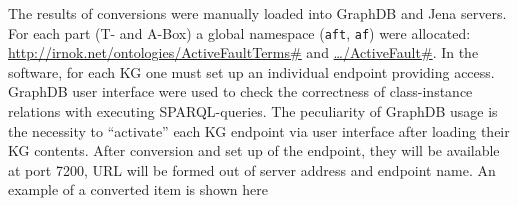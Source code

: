 \documentclass[
]{ceurart}
\begin{document}
The results of conversions were manually loaded into GraphDB and Jena servers.  For each part (T- and A-Box) a global namespace (\texttt{aft}, \texttt{af}) were allocated: \url{http://irnok.net/ontologies/ActiveFaultTerms\#} and \href{http://irnok.net/ontologies/ActiveFault\#}{\ldots/ActiveFault\#}.  In the software, for each KG one must set up an individual endpoint providing access.  GraphDB user interface were used to check the correctness of class-instance relations with executing SPARQL-queries.  The peculiarity of GraphDB usage is the necessity to ``activate'' each KG endpoint via user interface after loading their KG contents.  After conversion and set up of the endpoint, they will be available at port 7200, URL will be formed out of server address and endpoint name.  An example of a converted item is shown here
\end{document}
